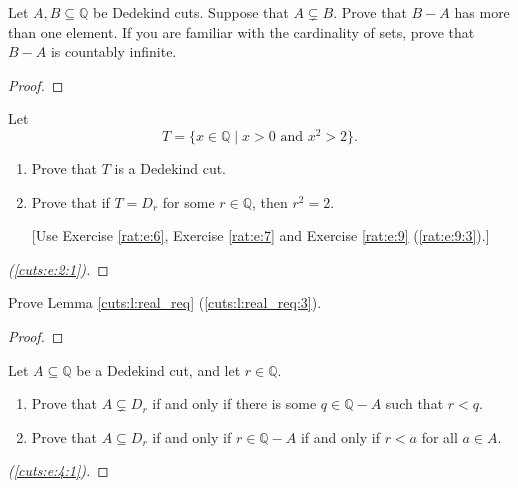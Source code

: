 \Newpage
\begin{exercise} %
	Let $A, B \subseteq \mathbb{Q}$ be Dedekind cuts. Suppose that $A \subsetneq B$. Prove that $B - A$ has more than one element. If you are familiar with the cardinality of sets, prove that $B - A$ is countably infinite.
\end{exercise}

\begin{proof}
	\TBD
\end{proof}


\Newpage
\begin{exercise} %
	\label{cuts:e:2}
	Let
	\[
		T = \{ x \in \mathbb{Q} \mid x > 0 \text{ and } x^2 > 2 \}.
	\]
	\begin{enumerate}
		\item \label{cuts:e:2:1}
		      Prove that $T$ is a Dedekind cut.
		\item \label{cuts:e:2:2}
		      Prove that if $T = D_r$ for some $r \in \mathbb{Q}$, then $r^2 = 2$.

		      \hfill [Use Exercise \ref{rat:e:6}, Exercise \ref{rat:e:7} and Exercise \ref{rat:e:9} (\ref{rat:e:9:3}).]
	\end{enumerate}
\end{exercise}

\begin{proof}[(\ref{cuts:e:2:1})]
	\TBD
\end{proof}



\Newpage
\begin{exercise} %
	Prove Lemma \ref{cuts:l:real_req} (\ref{cuts:l:real_req:3}).
\end{exercise}

\begin{proof}
	\TBD
\end{proof}


\Newpage
\begin{exercise} %
	\label{cuts:e:4}
	Let $A \subseteq \mathbb{Q}$ be a Dedekind cut, and let $r \in \mathbb{Q}$.
	\begin{enumerate}
		\item \label{cuts:e:4:1}
		      Prove that $A \subsetneq D_r$ if and only if there is some $q \in \mathbb{Q} - A$ such that $r < q$.
		\item \label{cuts:e:4:2}
		      Prove that $A \subseteq D_r$ if and only if $r \in \mathbb{Q} - A$ if and only if $r < a$ for all $a \in A$.
	\end{enumerate}
\end{exercise}

\begin{proof}[(\ref{cuts:e:4:1})]
	\TBD
\end{proof}

